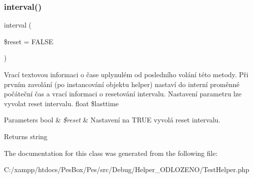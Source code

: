 \subsubsection{\texorpdfstring{interval()}{interval()}}
{\footnotesize\ttfamily interval (\begin{DoxyParamCaption}\item[{}]{\$reset = {\ttfamily FALSE} }\end{DoxyParamCaption})}

Vrací textovou informaci o čase uplynulém od posledního volání této metody. Při prvním zavolání (po instancování objektu helper) nastaví do interní proměnné počáteční čas a vrací informaci o resetování intervalu. Nastavení parametru lze vyvolat reset intervalu.  float \$lasttime 
\begin{DoxyParams}[1]{Parameters}
bool & {\em \$reset} & Nastavení na T\+R\+UE vyvolá reset intervalu. \\
\hline
\end{DoxyParams}
\begin{DoxyReturn}{Returns}
string 
\end{DoxyReturn}


The documentation for this class was generated from the following file\+:\begin{DoxyCompactItemize}
\item 
C\+:/xampp/htdocs/\+Pes\+Box/\+Pes/src/\+Debug/\+Helper\+\_\+\+O\+D\+L\+O\+Z\+E\+N\+O/Test\+Helper.\+php\end{DoxyCompactItemize}
